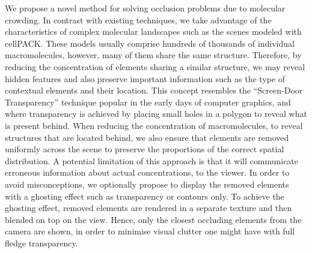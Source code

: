 We propose a novel method for solving occlusion problems due to molecular crowding.
In contrast with existing techniques, we take advantage of the characteristics of complex molecular landscapes such as the scenes modeled with cellPACK.
These models usually comprise hundreds of thousands of individual macromolecules, however, many of them share the same structure.
Therefore, by reducing the concentration of elements sharing a similar structure, we may reveal hidden features and also preserve important information such as the type of contextual elements and their location.
This concept resembles the “Screen-Door Transparency” technique popular in the early days of computer graphics, and where transparency is achieved by placing small holes in a polygon to reveal what is present behind.
When reducing the concentration of macromolecules, to reveal structures that are located behind, we also ensure that elements are removed uniformly across the scene to preserve the proportions of the correct spatial distribution.
A potential limitation of this approach is that it will communicate erroneous information about actual concentrations, to the viewer.
In order to avoid misconceptions, we optionally propose to display the removed elements with a ghosting effect such as transparency or contours only.
To achieve the ghosting effect, removed elements are rendered in a separate texture and then blended on top on the view.
Hence, only the closest occluding elements from the camera are shown, in order to minimise visual clutter one might have with full fledge transparency.

